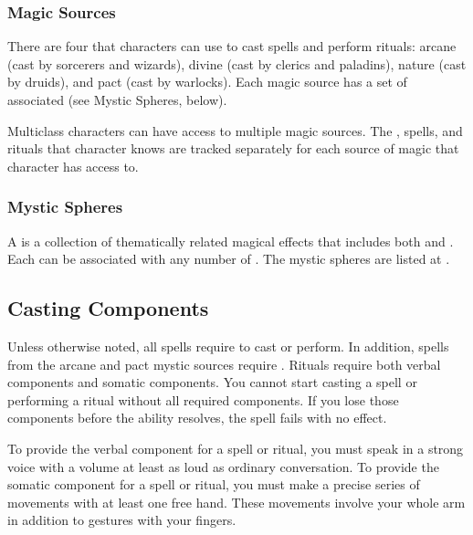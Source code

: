     \subsubsection{Magic Sources}
      There are four  that characters can use to cast spells and perform rituals: arcane (cast by sorcerers and wizards), divine (cast by clerics and paladins), nature (cast by druids), and pact (cast by warlocks).
      Each magic source has a set of associated  (see Mystic Spheres, below).

      Multiclass characters can have access to multiple magic sources.
      The , spells, and rituals that character knows are tracked separately for each source of magic that character has access to.

    \subsubsection{Mystic Spheres}
      A  is a collection of thematically related magical effects that includes both  and .
      Each  can be associated with any number of .
      The mystic spheres are listed at .

  \subsection{Casting Components}\label{Casting Components}
    Unless otherwise noted, all spells require  to cast or perform.
    In addition, spells from the arcane and pact mystic sources require .
    Rituals require both verbal components and somatic components.
    You cannot start casting a spell or performing a ritual without all required components.
    If you lose those components before the ability resolves, the spell fails with no effect.

    To provide the verbal component for a spell or ritual, you must speak in a strong voice with a volume at least as loud as ordinary conversation.
    To provide the somatic component for a spell or ritual, you must make a precise series of movements with at least one free hand.
    These movements involve your whole arm in addition to gestures with your fingers.


